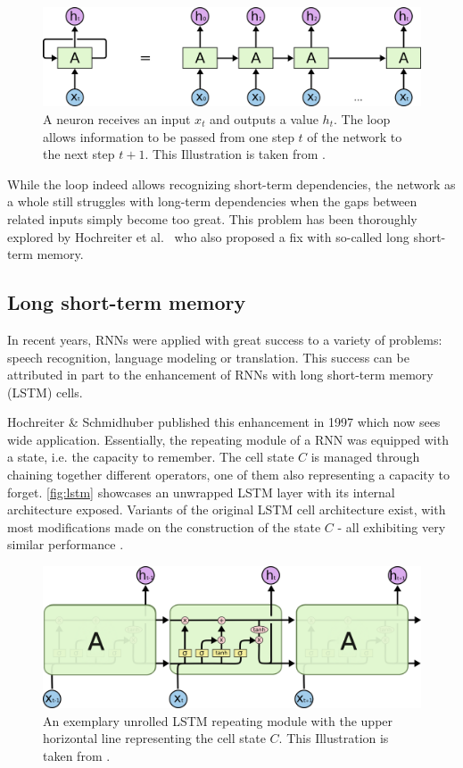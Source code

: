 \begin{figure}
    \centering
    \includegraphics[width=.9\textwidth]{gfx/rnn-unrolled.png}
    \caption{A neuron receives an input $x_t$ and outputs a value $h_t$. The loop allows information to be passed from one step $t$ of the network to the next step $t+1$. This Illustration is taken from \cite{web:colah}.}
    \label{fig:rnn-unrolled}
\end{figure}

While the loop indeed allows recognizing short-term dependencies, the network as a whole still struggles with long-term dependencies when the gaps between related inputs simply become too great. This problem has been thoroughly explored by Hochreiter et al.~\cite{hochreiter1991untersuchungen} who also proposed a fix with so-called long short-term memory.

\subsection{Long short-term memory}
In recent years, RNNs were applied with great success to a variety of problems: speech recognition, language modeling or translation. This success can be attributed in part to the enhancement of RNNs with long short-term memory (LSTM) cells.

Hochreiter \& Schmidhuber published this enhancement in 1997 \cite{hochreiter1997} which now sees wide application. Essentially, the repeating module of a RNN was equipped with a state, i.e. the capacity to remember. The cell state $C$ is managed through chaining together different operators, one of them also representing a capacity to forget. \autoref{fig:lstm} showcases an unwrapped LSTM layer with its internal architecture exposed. Variants of the original LSTM cell architecture exist, with most modifications made on the construction of the state $C$ - all exhibiting very similar performance \cite{greff2017lstm}.

\begin{figure}[ht!]
    \centering
    \includegraphics[width=.8\textwidth]{gfx/lstm-chain.png}
    \caption{An exemplary unrolled LSTM repeating module with the upper horizontal line representing the cell state $C$. This Illustration is taken from \cite{web:colah}.}
    \label{fig:lstm}
\end{figure}

